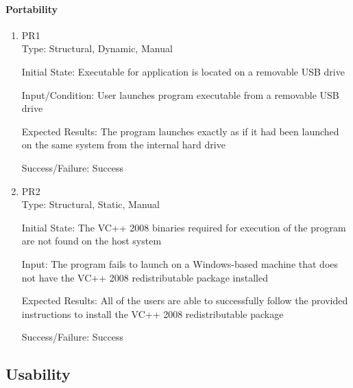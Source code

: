 \documentclass[12pt, titlepage]{article}
\begin{document}
	\paragraph{Portability}
	\begin{enumerate}
		\item{PR1\\}
		Type: Structural, Dynamic, Manual
		
		Initial State: Executable for application is located on a removable USB drive
		
		Input/Condition: User launches program executable from a removable USB drive
		
		Expected Results: The program launches exactly as if it had been launched on
		the same system from the internal hard drive

		Success/Failure: Success
		\item{PR2\\}
		Type: Structural, Static, Manual
		
		Initial State: The VC++ 2008 binaries required for execution of the program
		are not found on the host system
		
		Input: The program fails to launch on a Windows-based machine that does not
		have the VC++ 2008 redistributable package installed
		
		Expected Results: All of the users are able to successfully follow the provided
		instructions to install the VC++ 2008 redistributable package

		Success/Failure: Success
	\end{enumerate}

	\subsection{Usability}
\end{document}
